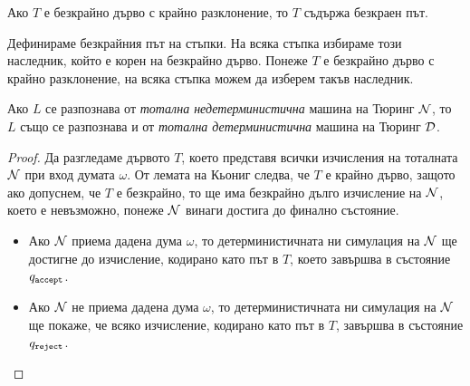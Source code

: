 \begin{prop}
  Ако $T$ е безкрайно дърво с крайно разклонение, то $T$ съдържа безкраен път.
\end{prop}
\begin{hint}
  Дефинираме безкрайния път на стъпки.
  На всяка стъпка избираме този наследник, който е корен на безкрайно дърво.
  Понеже $T$ е безкрайно дърво с крайно разклонение, на всяка стъпка можем да изберем такъв наследник.
\end{hint}

\begin{cor}
  Ако $L$ се разпознава от {\em тотална недетерминистична} машина на Тюринг $\mathcal{N}$, то $L$
  също се разпознава и от {\em тотална детерминистична} машина на Тюринг $\mathcal{D}$.
\end{cor}
\begin{proof}
  Да разгледаме дървото $T$, което представя всички изчисления на тоталната $\mathcal{N}$ при вход думата $\omega$.
  От лемата на Кьониг следва, че $T$ е крайно дърво, защото ако допуснем, че $T$ е безкрайно, то ще има безкрайно дълго изчисление на $\mathcal{N}$,
  което е невъзможно, понеже $\mathcal{N}$ винаги достига до финално състояние.
  \begin{itemize}
  \item 
    Ако $\mathcal{N}$ приема дадена дума $\omega$, то детерминистичната ни симулация на $\mathcal{N}$ ще достигне до изчисление, кодирано като път в $T$, 
    което завършва в състояние $q_{\texttt{accept}}$.
  \item
    Ако $\mathcal{N}$ не приема дадена дума $\omega$, то детерминистичната ни симулация на $\mathcal{N}$ ще покаже, че всяко изчисление, кодирано като път в $T$, завършва в състояние $q_{\texttt{reject}}$.
  \end{itemize}
\end{proof}



